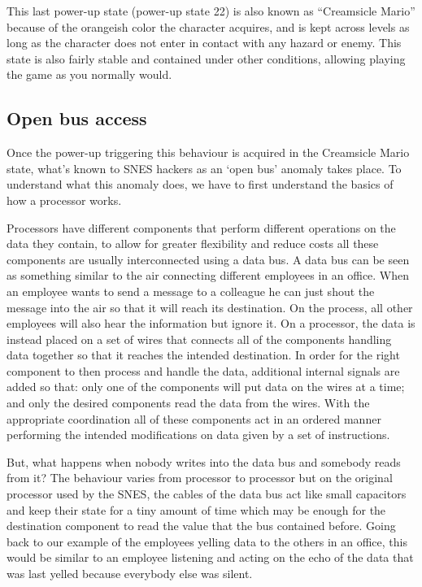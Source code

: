 \documentclass[]{article}
\begin{document}
This last power-up state (power-up state 22) is also known as
``Creamsicle Mario'' because of the orangeish color the character
acquires, and is kept across levels as long as the character does not
enter in contact with any hazard or enemy. This state is also fairly
stable and contained under other conditions, allowing playing the game
as you normally would.

\hypertarget{open-bus-access}{%
\subsection{Open bus access}\label{open-bus-access}}

Once the power-up triggering this behaviour is acquired in the
Creamsicle Mario state, what's known to SNES hackers as an `open bus'
anomaly takes place. To understand what this anomaly does, we have to
first understand the basics of how a processor works.

Processors have different components that perform different operations
on the data they contain, to allow for greater flexibility and reduce
costs all these components are usually interconnected using a data bus.
A data bus can be seen as something similar to the air connecting
different employees in an office. When an employee wants to send a
message to a colleague he can just shout the message into the air so
that it will reach its destination. On the process, all other employees
will also hear the information but ignore it. On a processor, the data
is instead placed on a set of wires that connects all of the components
handling data together so that it reaches the intended destination. In
order for the right component to then process and handle the data,
additional internal signals are added so that: only one of the
components will put data on the wires at a time; and only the desired
components read the data from the wires. With the appropriate
coordination all of these components act in an ordered manner performing
the intended modifications on data given by a set of instructions.

But, what happens when nobody writes into the data bus and somebody
reads from it? The behaviour varies from processor to processor but on
the original processor used by the SNES, the cables of the data bus act
like small capacitors and keep their state for a tiny amount of time
which may be enough for the destination component to read the value that
the bus contained before. Going back to our example of the employees
yelling data to the others in an office, this would be similar to an
employee listening and acting on the echo of the data that was last
yelled because everybody else was silent.
\end{document}
